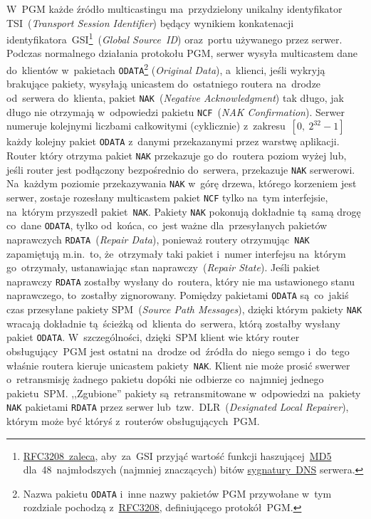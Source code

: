 \documentclass[thesis]{subfiles}
\begin{document}
W~PGM każde źródło multicastingu ma~przydzielony unikalny identyfikator TSI~(\emph{Transport Session Identifier}) będący wynikiem konkatenacji identyfikatora~GSI\footnote{\href{https://tools.ietf.org/html/rfc3208\#page-33}{RFC3208~zaleca}, aby~za~GSI przyjąć wartość funkcji haszującej~\href{https://en.wikipedia.org/wiki/MD5}{MD5} dla~48~najmłodszych (najmniej znaczących) bitów \href{https://tools.ietf.org/html/rfc2535\#section-4}{sygnatury~DNS} serwera.}~(\emph{Global Source~ID}) oraz~portu używanego przez serwer. Podczas normalnego działania protokołu PGM, serwer wysyła multicastem dane do~klientów w~pakietach \texttt{ODATA}\footnote{Nazwa pakietu \texttt{ODATA} i~inne nazwy pakietów PGM przywołane w~tym rozdziale pochodzą z~\href{https://tools.ietf.org/html/rfc3208}{RFC3208}, definiującego protokół~PGM.} (\emph{Original Data}), a~klienci, jeśli wykryją brakujące pakiety, wysyłają unicastem do~ostatniego routera na~drodze od~serwera do~klienta, pakiet \texttt{NAK}~(\emph{Negative Acknowledgment}) tak długo, jak długo nie otrzymają w~odpowiedzi pakietu \texttt{NCF}~(\emph{NAK Confirmation}). Serwer numeruje kolejnymi liczbami całkowitymi (cyklicznie) z~zakresu~$[0,~2^{32}-1]$ każdy kolejny pakiet \texttt{ODATA} z~danymi przekazanymi przez warstwę aplikacji. Router który otrzyma pakiet \texttt{NAK} przekazuje go do~routera poziom wyżej lub, jeśli router jest podłączony bezpośrednio do~serwera, przekazuje \texttt{NAK} serwerowi. Na~każdym poziomie przekazywania \texttt{NAK} w~górę drzewa, którego korzeniem jest serwer, zostaje rozesłany multicastem pakiet \texttt{NCF} tylko na~tym interfejsie, na~którym przyszedł pakiet~\texttt{NAK}. Pakiety \texttt{NAK} pokonują dokładnie tą~samą drogę co~dane \texttt{ODATA}, tylko od~końca, co~jest ważne dla~przesyłanych pakietów naprawczych \texttt{RDATA}~(\emph{Repair Data}), ponieważ routery otrzymując~\texttt{NAK} zapamiętują m.in.~to, że~otrzymały taki pakiet i~numer interfejsu na~którym go~otrzymały, ustanawiając stan naprawczy~(\emph{Repair State}). Jeśli pakiet naprawczy \texttt{RDATA} zostałby wysłany do~routera, który nie ma ustawionego stanu naprawczego, to~zostałby zignorowany. Pomiędzy pakietami \texttt{ODATA} są~co~jakiś czas przesyłane pakiety SPM~(\emph{Source Path Messages}), dzięki którym pakiety \texttt{NAK} wracają dokładnie tą~ścieżką od~klienta do~serwera, którą zostałby wysłany pakiet \texttt{ODATA}. W~szczególności, dzięki~SPM klient wie który router obsługujący~PGM jest ostatni na~drodze od~źródła do~niego semgo i~do~tego właśnie routera kieruje unicastem pakiety~\texttt{NAK}. Klient nie może prosić swerwer o~retransmisję żadnego pakietu dopóki nie odbierze co~najmniej jednego pakietu~SPM. ,,Zgubione'' pakiety są~retransmitowane w~odpowiedzi na~pakiety \texttt{NAK} pakietami \texttt{RDATA} przez serwer lub~tzw.~DLR~(\emph{Designated Local Repairer}), którym może być któryś z~routerów obsługujących~PGM.
\end{document}
